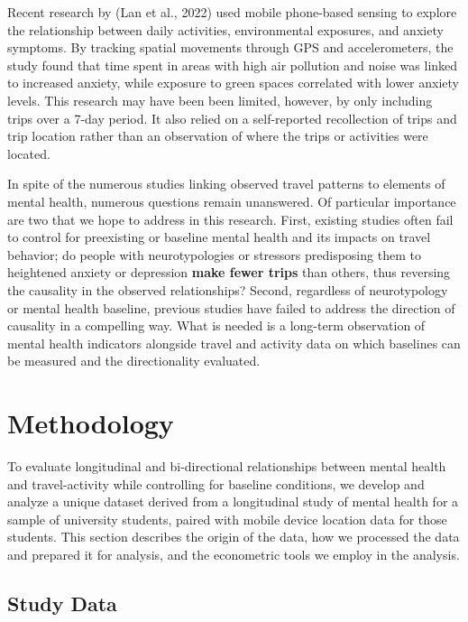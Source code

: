 \documentclass[
  letterpaper,
  number,
  review,
  3p]{elsarticle}
\begin{document}
Recent research by (Lan et al., 2022) used mobile phone-based sensing to
explore the relationship between daily activities, environmental
exposures, and anxiety symptoms. By tracking spatial movements through
GPS and accelerometers, the study found that time spent in areas with
high air pollution and noise was linked to increased anxiety, while
exposure to green spaces correlated with lower anxiety levels. This
research may have been been limited, however, by only including trips
over a 7-day period. It also relied on a self-reported recollection of
trips and trip location rather than an observation of where the trips or
activities were located.

In spite of the numerous studies linking observed travel patterns to
elements of mental health, numerous questions remain unanswered. Of
particular importance are two that we hope to address in this research.
First, existing studies often fail to control for preexisting or
baseline mental health and its impacts on travel behavior; do people
with neurotypologies or stressors predisposing them to heightened
anxiety or depression \textbf{make fewer trips} than others, thus
reversing the causality in the observed relationships? Second,
regardless of neurotypology or mental health baseline, previous studies
have failed to address the direction of causality in a compelling way.
What is needed is a long-term observation of mental health indicators
alongside travel and activity data on which baselines can be measured
and the directionality evaluated.


\section{Methodology}\label{sec-methods}

To evaluate longitudinal and bi-directional relationships between mental
health and travel-activity while controlling for baseline conditions, we
develop and analyze a unique dataset derived from a longitudinal study
of mental health for a sample of university students, paired with mobile
device location data for those students. This section describes the
origin of the data, how we processed the data and prepared it for
analysis, and the econometric tools we employ in the analysis.

\subsection{Study Data}\label{study-data}
\end{document}
